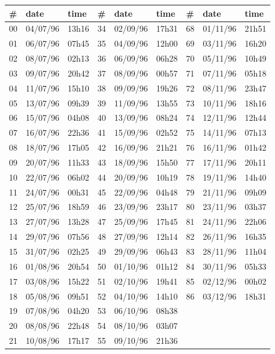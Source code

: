 \documentclass{tufte-handout}
\begin{document}
\begin{table}
\begin{tabular}{lll|lll|lll}
\# & date & time & \# & date & time & \# & date & time \\ \hline
00 & 04/07/96 & 13h16 & 34 & 02/09/96 & 17h31 & 68 & 01/11/96 & 21h51\\
01 & 06/07/96 & 07h45 & 35 & 04/09/96 & 12h00 & 69 & 03/11/96 & 16h20\\
02 & 08/07/96 & 02h13 & 36 & 06/09/96 & 06h28 & 70 & 05/11/96 & 10h49\\
03 & 09/07/96 & 20h42 & 37 & 08/09/96 & 00h57 & 71 & 07/11/96 & 05h18\\
04 & 11/07/96 & 15h10 & 38 & 09/09/96 & 19h26 & 72 & 08/11/96 & 23h47\\
05 & 13/07/96 & 09h39 & 39 & 11/09/96 & 13h55 & 73 & 10/11/96 & 18h16\\
06 & 15/07/96 & 04h08 & 40 & 13/09/96 & 08h24 & 74 & 12/11/96 & 12h44\\
07 & 16/07/96 & 22h36 & 41 & 15/09/96 & 02h52 & 75 & 14/11/96 & 07h13\\
08 & 18/07/96 & 17h05 & 42 & 16/09/96 & 21h21 & 76 & 16/11/96 & 01h42\\
09 & 20/07/96 & 11h33 & 43 & 18/09/96 & 15h50 & 77 & 17/11/96 & 20h11\\
10 & 22/07/96 & 06h02 & 44 & 20/09/96 & 10h19 & 78 & 19/11/96 & 14h40\\
11 & 24/07/96 & 00h31 & 45 & 22/09/96 & 04h48 & 79 & 21/11/96 & 09h09\\
12 & 25/07/96 & 18h59 & 46 & 23/09/96 & 23h17 & 80 & 23/11/96 & 03h37\\
13 & 27/07/96 & 13h28 & 47 & 25/09/96 & 17h45 & 81 & 24/11/96 & 22h06\\
14 & 29/07/96 & 07h56 & 48 & 27/09/96 & 12h14 & 82 & 26/11/96 & 16h35\\
15 & 31/07/96 & 02h25 & 49 & 29/09/96 & 06h43 & 83 & 28/11/96 & 11h04\\
16 & 01/08/96 & 20h54 & 50 & 01/10/96 & 01h12 & 84 & 30/11/96 & 05h33\\
17 & 03/08/96 & 15h22 & 51 & 02/10/96 & 19h41 & 85 & 02/12/96 & 00h02\\
18 & 05/08/96 & 09h51 & 52 & 04/10/96 & 14h10 & 86 & 03/12/96 & 18h31\\
19 & 07/08/96 & 04h20 & 53 & 06/10/96 & 08h38 & & &\\
20 & 08/08/96 & 22h48 & 54 & 08/10/96 & 03h07 & & &\\
21 & 10/08/96 & 17h17 & 55 & 09/10/96 & 21h36 & & &\\

\end{tabular}
\end{table}
\end{document}
